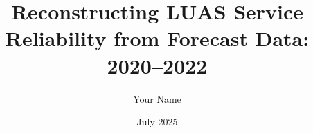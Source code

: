 \documentclass[12pt]{report}
\title{Reconstructing LUAS Service Reliability from Forecast Data: 2020–2022}
\author{Your Name}
\date{July 2025}
\begin{document}
	
	\maketitle
	\tableofcontents
	\listoffigures
	\listoftables
	
	\doublespacing
	
	
	
	
	
	
	
	
	
	
	
	
\end{document}
